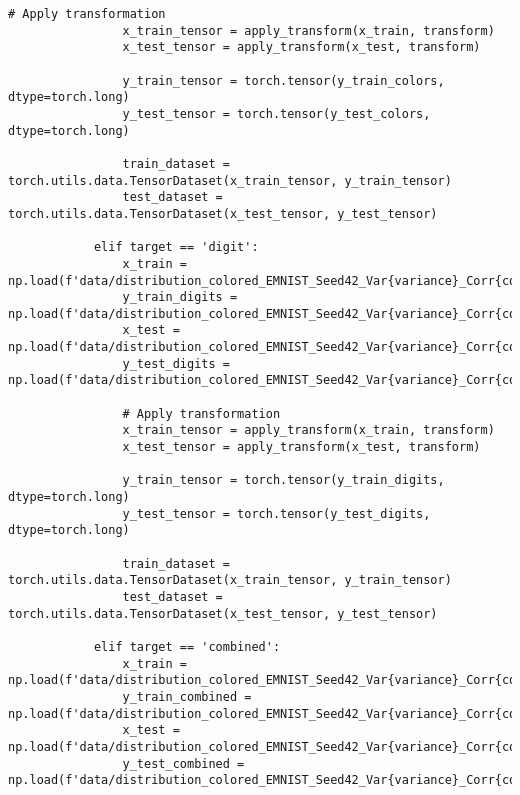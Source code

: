 \begin{lstlisting}[style=pythonstyle, caption={Program Example}]
                # Apply transformation
                x_train_tensor = apply_transform(x_train, transform)
                x_test_tensor = apply_transform(x_test, transform)
                
                y_train_tensor = torch.tensor(y_train_colors, dtype=torch.long)
                y_test_tensor = torch.tensor(y_test_colors, dtype=torch.long)
                
                train_dataset = torch.utils.data.TensorDataset(x_train_tensor, y_train_tensor)
                test_dataset = torch.utils.data.TensorDataset(x_test_tensor, y_test_tensor)
            
            elif target == 'digit':
                x_train = np.load(f'data/distribution_colored_EMNIST_Seed42_Var{variance}_Corr{correlation}/x_train_colored.npy')
                y_train_digits = np.load(f'data/distribution_colored_EMNIST_Seed42_Var{variance}_Corr{correlation}/y_train_digits.npy')
                x_test = np.load(f'data/distribution_colored_EMNIST_Seed42_Var{variance}_Corr{correlation}/x_test_colored.npy')
                y_test_digits = np.load(f'data/distribution_colored_EMNIST_Seed42_Var{variance}_Corr{correlation}/y_test_digits.npy')
                
                # Apply transformation
                x_train_tensor = apply_transform(x_train, transform)
                x_test_tensor = apply_transform(x_test, transform)
                
                y_train_tensor = torch.tensor(y_train_digits, dtype=torch.long)
                y_test_tensor = torch.tensor(y_test_digits, dtype=torch.long)
                
                train_dataset = torch.utils.data.TensorDataset(x_train_tensor, y_train_tensor)
                test_dataset = torch.utils.data.TensorDataset(x_test_tensor, y_test_tensor)
                
            elif target == 'combined':
                x_train = np.load(f'data/distribution_colored_EMNIST_Seed42_Var{variance}_Corr{correlation}/x_train_colored.npy')
                y_train_combined = np.load(f'data/distribution_colored_EMNIST_Seed42_Var{variance}_Corr{correlation}/y_train_combined.npy')
                x_test = np.load(f'data/distribution_colored_EMNIST_Seed42_Var{variance}_Corr{correlation}/x_test_colored.npy')
                y_test_combined = np.load(f'data/distribution_colored_EMNIST_Seed42_Var{variance}_Corr{correlation}/y_test_combined.npy')
                

\end{lstlisting}
